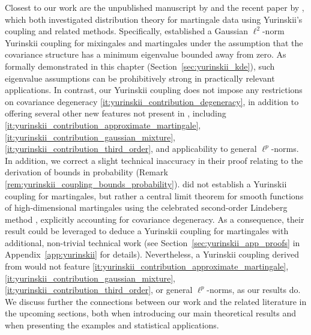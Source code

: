 Closest to our work are the unpublished manuscript by \citet{belloni2018high}
and the recent paper by \citet{li2020uniform}, which both investigated
distribution theory for martingale data using Yurinskii's coupling and related
methods. Specifically, \citet{li2020uniform} established a Gaussian
$\ell^2$-norm Yurinskii coupling for mixingales and martingales under the
assumption that the covariance structure has a minimum eigenvalue bounded away
from zero. As formally demonstrated in this chapter
(Section~\ref{sec:yurinskii_kde}),
such eigenvalue assumptions can be prohibitively strong in practically relevant
applications. In contrast, our Yurinskii coupling does not impose any
restrictions on covariance degeneracy
\ref{it:yurinskii_contribution_degeneracy}, in
addition to offering several other new features not present in
\citet{li2020uniform}, including
\ref{it:yurinskii_contribution_approximate_martingale},
\ref{it:yurinskii_contribution_gaussian_mixture},
\ref{it:yurinskii_contribution_third_order}, and
applicability to general $\ell^p$-norms. In addition, we correct a slight
technical inaccuracy in their proof relating to the derivation of bounds in
probability (Remark \ref{rem:yurinskii_coupling_bounds_probability}).
\citet{belloni2018high} did not establish a Yurinskii coupling for martingales,
but rather a central limit theorem for smooth functions of high-dimensional
martingales using the celebrated second-order Lindeberg method
\citep[see][and references therein]{chatterjee2006generalization}, explicitly
accounting for covariance degeneracy. As a consequence, their result could be
leveraged to deduce a Yurinskii coupling for martingales with additional,
non-trivial technical work (see Section~\ref{sec:yurinskii_app_proofs}
in Appendix~\ref{app:yurinskii} for details).
Nevertheless, a Yurinskii coupling derived from
\citet{belloni2018high} would not feature
\ref{it:yurinskii_contribution_approximate_martingale},
\ref{it:yurinskii_contribution_gaussian_mixture},
\ref{it:yurinskii_contribution_third_order}, or
general $\ell^p$-norms, as our results do. We discuss further the connections
between our work and the related literature in the upcoming sections, both when
introducing our main theoretical results and when presenting the examples and
statistical applications.

